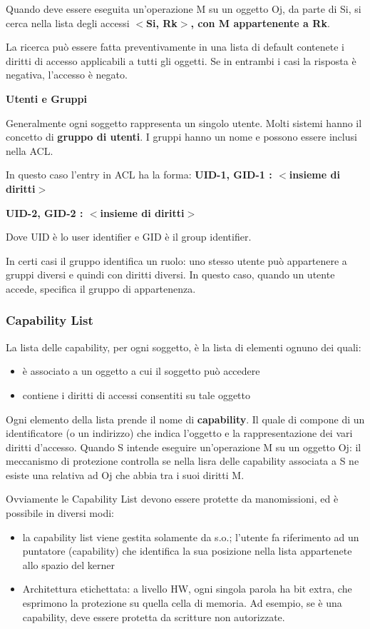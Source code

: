 \documentclass{article}
\begin{document}
Quando deve essere eseguita un'operazione M su un oggetto Oj, da parte di Si, si cerca nella lista degli accessi \textbf{$<$Si, Rk$>$, con M appartenente a Rk}.

La ricerca può essere fatta preventivamente in una lista di default contenete i diritti di accesso applicabili a tutti gli oggetti. 
Se in entrambi i casi la risposta è negativa, l'accesso è negato.

\vspace{3mm}
\textbf{Utenti e Gruppi}
\vspace{3mm}

Generalmente ogni soggetto rappresenta un singolo utente. Molti sistemi hanno il concetto di \textbf{gruppo di utenti}. I gruppi hanno un nome e possono essere inclusi nella ACL.

In questo caso l'entry in ACL ha la forma:
\textbf{UID-1, GID-1 : $<$insieme di diritti$>$}

\textbf{UID-2, GID-2 : $<$insieme di diritti$>$}

Dove UID è lo user identifier e GID è il group identifier.

\vspace{3mm}
In certi casi il gruppo identifica un ruolo: uno stesso utente può appartenere a gruppi diversi e quindi  con diritti diversi. In questo caso, quando un utente accede, specifica il
gruppo di appartenenza.

\subsubsection{Capability List}
La lista delle capability, per ogni soggetto, è la lista di elementi ognuno dei quali:
\begin{itemize}
    \item è associato a un oggetto a cui il soggetto può accedere
    \item contiene i diritti di accessi consentiti su tale oggetto
\end{itemize}

\vspace{3mm}
Ogni elemento della lista prende il nome di \textbf{capability}. Il quale di compone di un identificatore (o un indirizzo) che indica l'oggetto e la rappresentazione dei vari diritti d'accesso.
Quando S intende eseguire un'operazione M su un oggetto Oj: il meccanismo di protezione controlla se nella lisra delle capability associata a S ne esiste una relativa ad Oj che abbia
tra i suoi diritti M.

\vspace{3mm}
Ovviamente le Capability List devono essere protette da manomissioni, ed è possibile in diversi modi:
\begin{itemize}
    \item la capability list viene gestita solamente da s.o.; l'utente fa riferimento ad un puntatore (capability) che identifica la sua posizione nella lista appartenete allo spazio del kerner
    \item Architettura etichettata: a livello HW, ogni singola parola ha bit extra, che esprimono la protezione su quella cella di memoria. Ad esempio, se è una capability, deve essere
    protetta da scritture non autorizzate.
\end{itemize}
\end{document}
